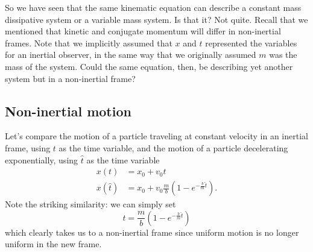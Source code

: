 So we have seen that the same kinematic equation can describe a constant mass dissipative system or a variable mass system. Is that it? Not quite. Recall that we mentioned that kinetic and conjugate momentum will differ in non-inertial frames. Note that we implicitly assumed that $x$ and $t$ represented the variables for an inertial observer, in the same way that we originally assumed $m$ was the mass of the system. Could the same equation, then, be describing yet another system but in a non-inertial frame?

\subsection{Non-inertial motion}

Let's compare the motion of a particle traveling at constant velocity in an inertial frame, using $t$ as the time variable, and the motion of a particle decelerating exponentially, using $\hat{t}$ as the time variable
\begin{equation}
	\begin{aligned}
		x(t) &= x_0 + v_0 t \\
		x(\hat{t}) &= x_0 + v_0 \frac{m}{b}\left(1-e^{-\frac{b}{m}\hat{t}}\right).
	\end{aligned}
\end{equation}
Note the striking similarity: we can simply set
\begin{equation}
	t = \frac{m}{b} \left(1-e^{-\frac{b}{m}\hat{t}}\right)
\end{equation}
which clearly takes us to a non-inertial frame since uniform motion is no longer uniform in the new frame.

